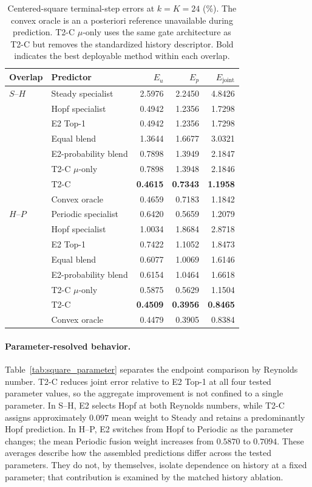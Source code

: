 \begin{table}[H]
\centering
\caption{
Centered-square terminal-step errors at $k=K=24$ (\%). The convex oracle is an a posteriori reference unavailable during prediction.
T2-C $\mu$-only uses the same gate architecture as T2-C but removes the standardized history descriptor. Bold indicates the best deployable method within each overlap.
}
\label{tab:square_fusion_full}
\small
\setlength{\tabcolsep}{5pt}
\begin{tabular}{@{}llrrr@{}}
\toprule
Overlap & Predictor & $E_u$ & $E_p$ & $E_{\mathrm{joint}}$ \\
\midrule
$S$--$H$ & Steady specialist & 2.5976 & 2.2450 & 4.8426 \\
 & Hopf specialist & 0.4942 & 1.2356 & 1.7298 \\
 & E2 Top-1 & 0.4942 & 1.2356 & 1.7298 \\
 & Equal blend & 1.3644 & 1.6677 & 3.0321 \\
 & E2-probability blend & 0.7898 & 1.3949 & 2.1847 \\
 & T2-C $\mu$-only & 0.7898 & 1.3948 & 2.1846 \\
 & T2-C & \textbf{0.4615} & \textbf{0.7343} & \textbf{1.1958} \\
 & Convex oracle & 0.4659 & 0.7183 & 1.1842 \\
\midrule
$H$--$P$ & Periodic specialist & 0.6420 & 0.5659 & 1.2079 \\
 & Hopf specialist & 1.0034 & 1.8684 & 2.8718 \\
 & E2 Top-1 & 0.7422 & 1.1052 & 1.8473 \\
 & Equal blend & 0.6077 & 1.0069 & 1.6146 \\
 & E2-probability blend & 0.6154 & 1.0464 & 1.6618 \\
 & T2-C $\mu$-only & 0.5875 & 0.5629 & 1.1504 \\
 & T2-C & \textbf{0.4509} & \textbf{0.3956} & \textbf{0.8465} \\
 & Convex oracle & 0.4479 & 0.3905 & 0.8384 \\
\bottomrule
\end{tabular}
\end{table}

\paragraph{Parameter-resolved behavior.}
Table~\ref{tab:square_parameter} separates the endpoint comparison
by Reynolds number. T2-C reduces joint error relative to E2 Top-1
at all four tested parameter values, so the aggregate improvement
is not confined to a single parameter.
In S--H, E2 selects Hopf at both Reynolds numbers, while T2-C assigns
approximately $0.097$ mean weight to Steady and retains a predominantly
Hopf prediction. In H--P, E2 switches from Hopf to Periodic as the
parameter changes; the mean Periodic fusion weight increases from
$0.5870$ to $0.7094$.
These averages describe how the assembled predictions differ across
the tested parameters. They do not, by themselves, isolate dependence
on history at a fixed parameter; that contribution is examined by
the matched history ablation.

